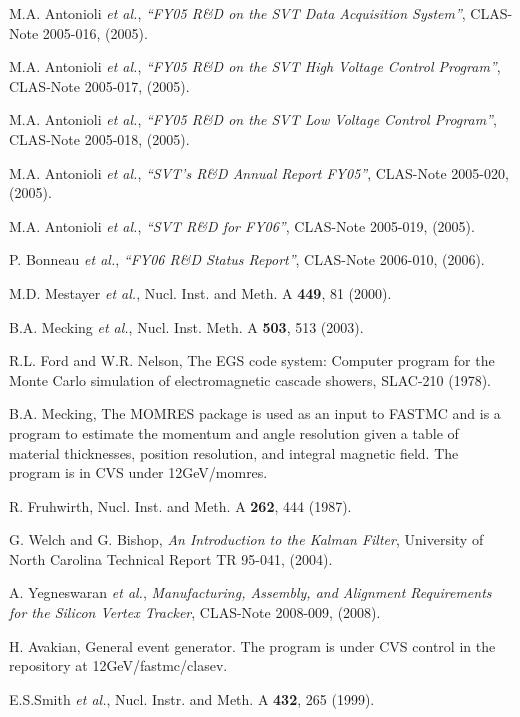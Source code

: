 \begin{thebibliography}{199}
M.A. Antonioli {\it et al.}, {\it ``FY05 R\&D on the SVT Data Acquisition 
System''}, CLAS-Note 2005-016, (2005).

M.A. Antonioli {\it et al.}, {\it ``FY05 R\&D on the SVT High Voltage Control 
Program''}, CLAS-Note 2005-017, (2005).

M.A. Antonioli {\it et al.}, {\it ``FY05 R\&D on the SVT Low Voltage Control 
Program''}, CLAS-Note 2005-018, (2005).

M.A. Antonioli {\it et al.}, {\it ``SVT's R\&D Annual Report FY05''},
CLAS-Note 2005-020, (2005).

M.A. Antonioli {\it et al.}, {\it ``SVT R\&D for FY06''},
CLAS-Note 2005-019, (2005).

P. Bonneau {\it et al.}, {\it ``FY06 R\&D Status Report''},
CLAS-Note 2006-010, (2006).

M.D. Mestayer {\it et al.}, Nucl. Inst. and Meth. A {\bf 449}, 81 (2000).

B.A. Mecking {\it et al.}, Nucl. Inst. Meth. A {\bf 503}, 513 (2003).

R.L. Ford and W.R. Nelson, The EGS code system: Computer program for the 
Monte Carlo simulation of electromagnetic cascade showers, SLAC-210 (1978).
 
B.A. Mecking, The MOMRES package is used as an input to FASTMC and is
a program to estimate the momentum and angle resolution given a table of 
material thicknesses, position resolution, and integral magnetic field.
The program is in CVS under 12GeV/momres.

R. Fruhwirth, Nucl. Inst. and Meth. A {\bf 262}, 444 (1987).

G. Welch and G. Bishop, {\it An Introduction to the Kalman Filter}, University
of North Carolina Technical Report TR 95-041, (2004).

A. Yegneswaran {\it et al.}, {\it Manufacturing, Assembly, and Alignment 
Requirements for the Silicon Vertex Tracker}, CLAS-Note 2008-009, (2008).

H. Avakian, General event generator.  The program is under CVS control in
the repository at 12GeV/fastmc/clasev.

%
%


%
%

E.S.Smith {\it et al.}, Nucl. Instr. and Meth. A {\bf 432}, 265 (1999).


\end{thebibliography}
